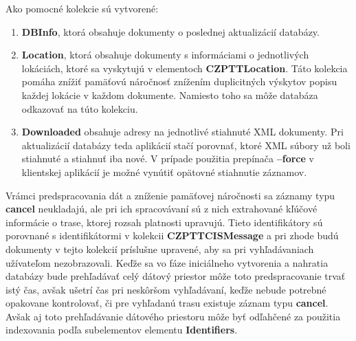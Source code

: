 \documentclass[10pt,xcolor=pdflatex,dvipsnames,table,oneside]{book}
\begin{document}
\newpage
\par Ako pomocné kolekcie sú vytvorené:
\begin{enumerate}
    \item \textbf{DBInfo}, ktorá obsahuje dokumenty o poslednej aktualizácií databázy.
    \item \textbf{Location}, ktorá obsahuje dokumenty s informáciami o jednotlivých lokáciách, ktoré sa vyskytujú v elementoch \textbf{CZPTTLocation}. Táto kolekcia pomáha znížiť pamäťovú náročnosť znížením  duplicitných výskytov popisu každej lokácie v každom dokumente. Namiesto toho sa môže databáza odkazovať na túto kolekciu.
    \item \textbf{Downloaded} obsahuje adresy na jednotlivé stiahnuté XML dokumenty. Pri aktualizácií databázy teda aplikácií stačí porovnať, ktoré XML súbory už boli stiahnuté a stiahnuť iba nové. V prípade použitia prepínača \textbf{--force} v klientskej aplikácií je možné vynútiť opätovné stiahnutie záznamov.
\end{enumerate}

\par Vrámci predspracovania dát a zníženie pamäťovej náročnosti sa záznamy typu \textbf{cancel} neukladajú, ale pri ich spracovávaní sú z nich extrahované kľúčové informácie o trase, ktorej rozsah platnosti upravujú. Tieto identifikátory sú porovnané s identifikátormi v kolekcii \textbf{CZPTTCISMessage} a pri zhode budú dokumenty v tejto kolekcií príslušne upravené, aby sa pri vyhľadávaniach užívateľom nezobrazovali. Keďže sa vo fáze iniciálneho vytvorenia a nahratia databázy bude prehľadávať celý dátový priestor môže toto predspracovanie trvať istý čas, avšak ušetrí čas pri neskôršom vyhľadávaní, keďže nebude potrebné opakovane kontrolovať, či pre vyhľadanú trasu existuje záznam typu \textbf{cancel}. Avšak aj toto prehľadávanie dátového priestoru môže byť odľahčené za použitia indexovania podľa subelementov elementu \textbf{Identifiers}.

\end{document}

